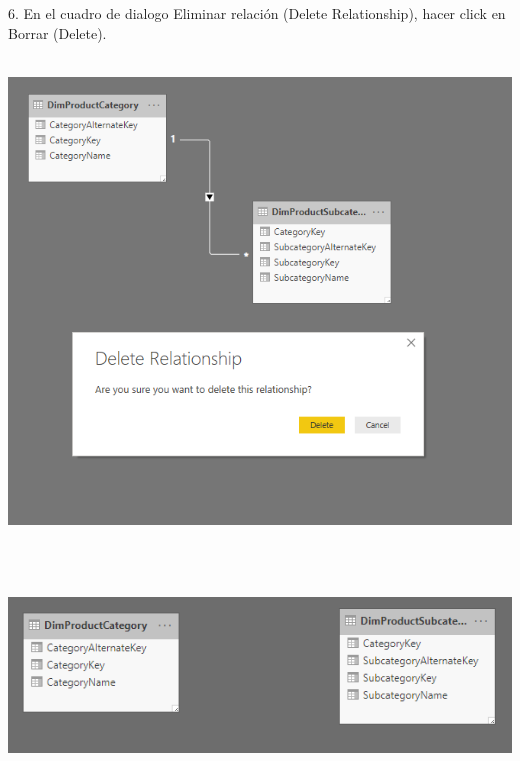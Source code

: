 \begin{flushleft}
\begin{itemize}
6. En el cuadro de dialogo Eliminar relación (Delete Relationship), hacer click en Borrar (Delete).\\
\textbf{ }\\
\begin{center}
	\includegraphics[width=20cm]{./Imagenes/img23} 
	\end{center}
\textbf{ }\\

\textbf{ }\\
\begin{center}
	\includegraphics[width=20cm]{./Imagenes/img24} 
	\end{center}
\textbf{ }\\


\end{itemize}
\end{flushleft}
